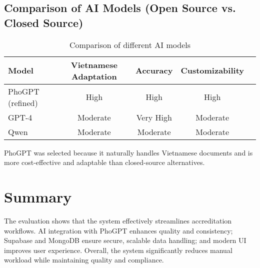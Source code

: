 \subsection{Comparison of AI Models (Open Source vs. Closed Source)}
\begin{table}[h]
\centering
\caption{Comparison of different AI models}
\begin{tabular}{|l|c|c|c|c|}
\hline
\textbf{Model} & \textbf{Vietnamese Adaptation} & \textbf{Accuracy} & \textbf{Customizability} \\ \hline
PhoGPT (refined) & High & High  & High \\ \hline
GPT-4 & Moderate & Very High & Moderate \\ \hline
Qwen & Moderate & Moderate & Moderate \\ \hline
\end{tabular}
\end{table}

PhoGPT was selected because it naturally handles Vietnamese documents and is more cost-effective and adaptable than closed-source alternatives.

\section{Summary}
The evaluation shows that the system effectively streamlines accreditation workflows.  
AI integration with PhoGPT enhances quality and consistency; Supabase and MongoDB ensure secure, scalable data handling; and modern UI improves user experience.  
Overall, the system significantly reduces manual workload while maintaining quality and compliance.